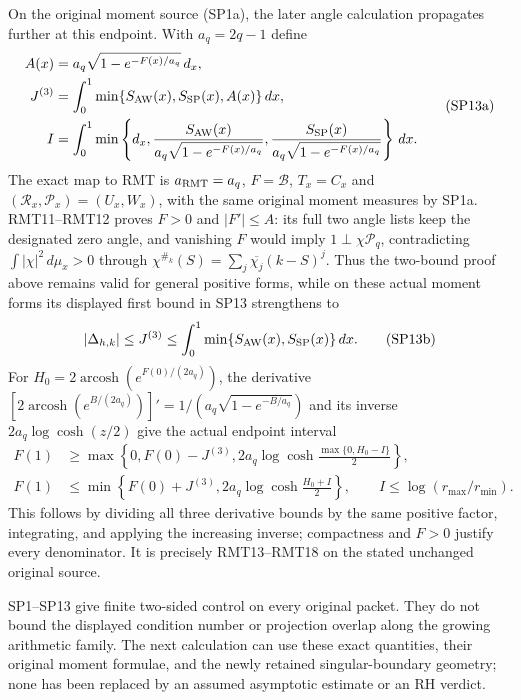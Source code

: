 On the original moment source (SP1a), the later angle calculation
propagates further at this endpoint. With $a_q=2q-1$ define
\[
 \begin{aligned}
 A(x)&=a_q\sqrt{1-e^{-F(x)/a_q}}\,d_x,\\
 J^{(3)}&=\int_0^1\min\{S_{\rm AW}(x),S_{\rm SP}(x),A(x)\}\,dx,\\
 I&=\int_0^1\min\left\{d_x,
 \frac{S_{\rm AW}(x)}{a_q\sqrt{1-e^{-F(x)/a_q}}},
 \frac{S_{\rm SP}(x)}{a_q\sqrt{1-e^{-F(x)/a_q}}}\right\}\,dx .
 \end{aligned}
 \tag{SP13a}
\]
The exact map to RMT is $a_{\rm RMT}=a_q$, $F=\mathcal B$, $T_x=C_x$ and
$(\mathcal R_x,\mathcal P_x)=(U_x,W_x)$, with the same original
moment measures by SP1a. RMT11--RMT12 proves $F>0$ and
$|F'|\le A$: its full two angle lists keep the designated zero
angle, and vanishing $F$ would imply $1\perp\chi\mathcal P_q$,
contradicting $\int|\chi|^2\,d\mu_x>0$ through
$\chi^{\#_k}(S)=\sum_j\overline{\chi_j}(k-S)^j$.
Thus the two-bound proof above remains valid for general positive
forms, while on these actual moment forms its displayed first
bound in SP13 strengthens to
\[
 |\Delta_{h,k}|\le J^{(3)}
 \le\int_0^1\min\{S_{\rm AW}(x),S_{\rm SP}(x)\}\,dx .
 \tag{SP13b}
\]
For $H_0=2\operatorname{arcosh}(e^{F(0)/(2a_q)})$, the derivative
$[2\operatorname{arcosh}(e^{B/(2a_q)})]'
=1/(a_q\sqrt{1-e^{-B/a_q}})$ and its inverse
$2a_q\log\cosh(z/2)$ give the actual endpoint interval
\[
 \begin{aligned}
 F(1)&\ge\max\left\{0,F(0)-J^{(3)},
 2a_q\log\cosh\frac{\max\{0,H_0-I\}}2\right\},\\
 F(1)&\le\min\left\{F(0)+J^{(3)},
 2a_q\log\cosh\frac{H_0+I}2\right\},
 \qquad I\le\log(r_{\max}/r_{\min}).
 \end{aligned}
 \tag{SP13c}
\]
This follows by dividing all three derivative bounds by the same
positive factor, integrating, and applying the increasing inverse;
compactness and $F>0$ justify every denominator. It is precisely
RMT13--RMT18 on the stated unchanged original source.

SP1--SP13 give finite two-sided control on every original packet.
They do not bound the displayed condition number or projection
overlap along the growing arithmetic family. The next calculation
can use these exact quantities, their original moment formulae,
and the newly retained singular-boundary geometry; none has been
replaced by an assumed asymptotic estimate or an RH verdict.
